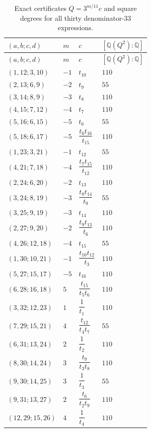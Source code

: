 \documentclass[11pt,a4paper]{article}
\theoremstyle{definition}
\theoremstyle{remark}
\numberwithin{equation}{section}
\begin{document}
\begingroup\small
\renewcommand{\arraystretch}{1.12}
\begin{longtable}{@{}llll@{}}
\caption{Exact certificates $Q=3^{m/11}c$ and square degrees for all
thirty denominator-$33$ expressions.}\label{tf-gamma33-certificates}\\
\toprule $(a,b;c,d)$ & $m$ & $c$ & $[\mathbb Q(Q^2):\mathbb Q]$\\
\midrule\endfirsthead
\toprule $(a,b;c,d)$ & $m$ & $c$ & $[\mathbb Q(Q^2):\mathbb Q]$\\
\midrule\endhead
\bottomrule\endfoot
$(1,12;3,10)$ & $-1$ & $t_{10}$ & $110$\\
$(2,13;6,9)$ & $-2$ & $t_{9}$ & $55$\\
$(3,14;8,9)$ & $-3$ & $t_{8}$ & $110$\\
$(4,15;7,12)$ & $-4$ & $t_{7}$ & $110$\\
$(5,16;6,15)$ & $-5$ & $t_{6}$ & $55$\\
$(5,18;6,17)$ & $-5$ & $\dfrac{t_{6}t_{16}}{t_{15}}$ & $110$\\
$(1,23;3,21)$ & $-1$ & $t_{12}$ & $55$\\
$(4,21;7,18)$ & $-4$ & $\dfrac{t_{7}t_{15}}{t_{12}}$ & $110$\\
$(2,24;6,20)$ & $-2$ & $t_{13}$ & $110$\\
$(3,24;8,19)$ & $-3$ & $\dfrac{t_{8}t_{14}}{t_{9}}$ & $55$\\
$(3,25;9,19)$ & $-3$ & $t_{14}$ & $110$\\
$(2,27;9,20)$ & $-2$ & $\dfrac{t_{9}t_{13}}{t_{6}}$ & $110$\\
$(4,26;12,18)$ & $-4$ & $t_{15}$ & $55$\\
$(1,30;10,21)$ & $-1$ & $\dfrac{t_{10}t_{12}}{t_{3}}$ & $110$\\
$(5,27;15,17)$ & $-5$ & $t_{16}$ & $110$\\
$(6,28;16,18)$ & $5$ & $\dfrac{t_{15}}{t_{5}t_{6}}$ & $110$\\
$(3,32;12,23)$ & $1$ & $\dfrac{1}{t_{1}}$ & $110$\\
$(7,29;15,21)$ & $4$ & $\dfrac{t_{12}}{t_{4}t_{7}}$ & $55$\\
$(6,31;13,24)$ & $2$ & $\dfrac{1}{t_{2}}$ & $110$\\
$(8,30;14,24)$ & $3$ & $\dfrac{t_{9}}{t_{3}t_{8}}$ & $110$\\
$(9,30;14,25)$ & $3$ & $\dfrac{1}{t_{3}}$ & $55$\\
$(9,31;13,27)$ & $2$ & $\dfrac{t_{6}}{t_{2}t_{9}}$ & $110$\\
$(12,29;15,26)$ & $4$ & $\dfrac{1}{t_{4}}$ & $110$\\

\end{longtable}
\end{document}
